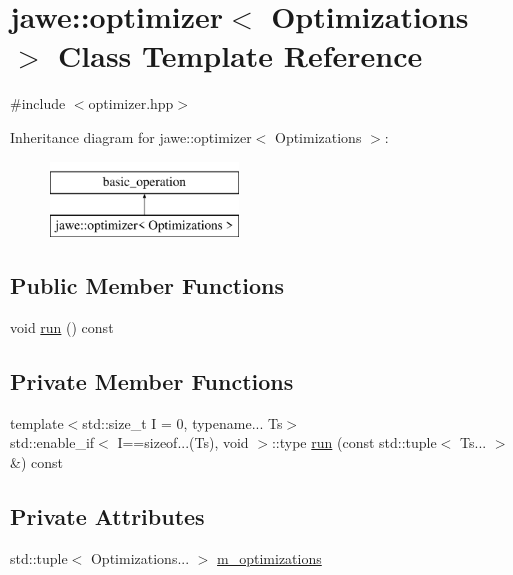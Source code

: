 \hypertarget{classjawe_1_1optimizer}{}\section{jawe\+:\+:optimizer$<$ Optimizations $>$ Class Template Reference}
\label{classjawe_1_1optimizer}


{\ttfamily \#include $<$optimizer.\+hpp$>$}

Inheritance diagram for jawe\+:\+:optimizer$<$ Optimizations $>$\+:\begin{figure}[H]
\begin{center}
\leavevmode
\includegraphics[height=2.000000cm]{classjawe_1_1optimizer}
\end{center}
\end{figure}
\subsection*{Public Member Functions}
\begin{DoxyCompactItemize}
\item 
void \hyperlink{classjawe_1_1optimizer_a9f2cc9d996d8804137c40c5ac44899b4}{run} () const
\end{DoxyCompactItemize}
\subsection*{Private Member Functions}
\begin{DoxyCompactItemize}
\item 
{\footnotesize template$<$std\+::size\+\_\+t I = 0, typename... Ts$>$ }\\std\+::enable\+\_\+if$<$ I==sizeof...(Ts), void $>$\+::type \hyperlink{classjawe_1_1optimizer_a239dd9dd5b62d17dfe369146de836404}{run} (const std\+::tuple$<$ Ts... $>$ \&) const
\end{DoxyCompactItemize}
\subsection*{Private Attributes}
\begin{DoxyCompactItemize}
\item 
std\+::tuple$<$ Optimizations... $>$ \hyperlink{classjawe_1_1optimizer_afc3e9e241057c762915ff5f3f1a62b00}{m\+\_\+optimizations}
\end{DoxyCompactItemize}


